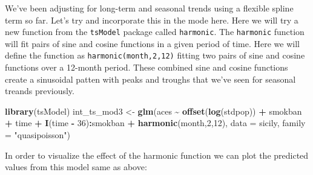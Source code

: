 \documentclass[
]{book}
\newenvironment{Shaded}{\begin{snugshade}}{\end{snugshade}}
\newcommand{\AttributeTok}[1]{\textcolor[rgb]{0.13,0.29,0.53}{#1}}
\newcommand{\DecValTok}[1]{\textcolor[rgb]{0.00,0.00,0.81}{#1}}
\newcommand{\FunctionTok}[1]{\textcolor[rgb]{0.13,0.29,0.53}{\textbf{#1}}}
\newcommand{\NormalTok}[1]{#1}
\newcommand{\OtherTok}[1]{\textcolor[rgb]{0.56,0.35,0.01}{#1}}
\newcommand{\SpecialCharTok}[1]{\textcolor[rgb]{0.81,0.36,0.00}{\textbf{#1}}}
\newcommand{\StringTok}[1]{\textcolor[rgb]{0.31,0.60,0.02}{#1}}
\begin{document}
We've been adjusting for long-term and seasonal trends using a flexible spline term so far. Let's try and incorporate this in the mode here. Here we will try a new function from the \texttt{tsModel} package called \texttt{harmonic}. The \texttt{harmonic} function will fit pairs of sine and cosine functions in a given period of time. Here we will define the function as \texttt{harmonic(month,2,12)} fitting two pairs of sine and cosine functions over a 12-month period. These combined sine and cosine functions create a sinusoidal patten with peaks and troughs that we've seen for seasonal treands previously.

\begin{Shaded}
\begin{Highlighting}[]
\FunctionTok{library}\NormalTok{(tsModel)}
\NormalTok{int\_ts\_mod3 }\OtherTok{\textless{}{-}} \FunctionTok{glm}\NormalTok{(aces }\SpecialCharTok{\textasciitilde{}} \FunctionTok{offset}\NormalTok{(}\FunctionTok{log}\NormalTok{(stdpop)) }\SpecialCharTok{+}\NormalTok{ smokban }\SpecialCharTok{+}\NormalTok{ time }\SpecialCharTok{+} 
                     \FunctionTok{I}\NormalTok{(time }\SpecialCharTok{{-}} \DecValTok{36}\NormalTok{)}\SpecialCharTok{:}\NormalTok{smokban }\SpecialCharTok{+} \FunctionTok{harmonic}\NormalTok{(month,}\DecValTok{2}\NormalTok{,}\DecValTok{12}\NormalTok{), }
                      \AttributeTok{data =}\NormalTok{ sicily, }
                      \AttributeTok{family =} \StringTok{"quasipoisson"}\NormalTok{)}
\end{Highlighting}
\end{Shaded}

In order to visualize the effect of the harmonic function we can plot the predicted values from this model same as above:
\end{document}
